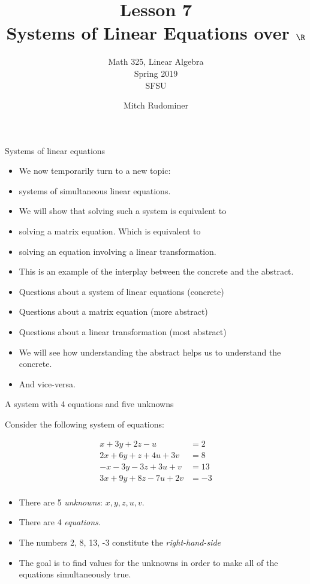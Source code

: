 \documentclass[handout]{beamer}
\title{Lesson 7 \\ Systems of Linear Equations over $\R$}
\subtitle{Math 325, Linear Algebra \\ Spring 2019 \\ SFSU}
\author{Mitch Rudominer}
\date{}
\begin{document}
\begin{frame}
  \titlepage
\end{frame}

\begin{frame}{Systems of linear equations}

\begin{itemize}
\item We now temporarily turn to a new topic:
\item systems of simultaneous linear equations.
\item We will show that solving such a system is equivalent to
\item solving a matrix equation. Which is equivalent to
\item solving an equation involving a linear transformation.
\item This is an example of the interplay between the concrete and the abstract.
\item Questions about a system of linear equations (concrete)
\item Questions about a matrix equation (more abstract)
\item Questions about a linear transformation (most abstract)
\item We will see how understanding the abstract helps us to understand the
concrete.
\item And vice-versa.
\end{itemize}
\end{frame}

\begin{frame}{A system with 4 equations and five unknowns}

Consider the following system of equations:

\begin{align*}
 x + 3y + 2z - u  \qquad &= 2 \\
2x + 6y + z + 4u + 3v  &= 8 \\
-x -3y  -3z + 3u + v  &= 13 \\
3x + 9y + 8z  -7u + 2v  &= -3 \\
\end{align*}

\begin{itemize}
\item There are 5 \emph{unknowns}: $x, y, z, u, v$.
\item There are 4 \emph{equations}.
\item The numbers 2, 8, 13, -3 constitute the \emph{right-hand-side}
\item The goal is to find values for the unknowns in order to make all of the
equations simultaneously true.
\end{itemize}

\end{frame}
\end{document}
